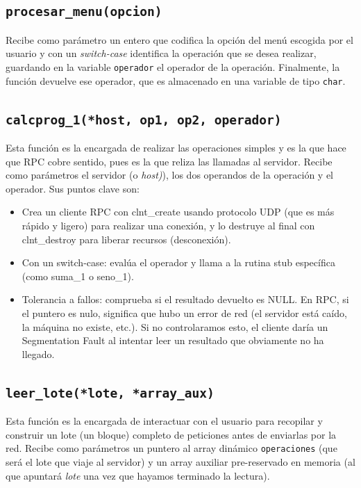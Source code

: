 \documentclass[a4paper,12pt]{article}
\begin{document}
	\subsection{\texttt{procesar\_menu(opcion)}}
		Recibe como parámetro un entero que codifica la opción del menú escogida por el usuario y con un \textit{switch-case} identifica la operación que se desea realizar, guardando en la variable \texttt{operador} el operador de la operación. Finalmente, la función devuelve ese operador, que es almacenado en una variable de tipo \texttt{char}.
		
	\subsection{\texttt{calcprog\_1(*host, op1, op2, operador)}}
		Esta función es la encargada de realizar las operaciones simples y es la que hace que RPC cobre sentido, pues es la que reliza las llamadas al servidor. Recibe como parámetros el servidor (o \textit{host)}), los dos operandos de la operación y el operador. Sus puntos clave son:
		\begin{itemize}
			\item Crea un cliente RPC con clnt\_create usando protocolo UDP (que es más rápido y ligero) para realizar una conexión, y lo destruye al final con clnt\_destroy para liberar recursos (desconexión).
			
			\item  Con un switch-case: evalúa el operador y llama a la rutina stub específica (como suma\_1 o seno\_1).
			
			\item  Tolerancia a fallos: comprueba si el resultado devuelto es NULL. En RPC, si el puntero es nulo, significa que hubo un error de red (el servidor está caído, la máquina no existe, etc.). Si no controlaramos esto, el cliente daría un Segmentation Fault al intentar leer un resultado que obviamente no ha llegado.
		\end{itemize}
		
	\subsection{\texttt{leer\_lote(*lote, *array\_aux)}}
		Esta función es la encargada de interactuar con el usuario para recopilar y construir un lote (un bloque)  completo de peticiones antes de enviarlas por la red. Recibe como parámetros un puntero al array dinámico \texttt{operaciones} (que será el lote que viaje al servidor) y un array auxiliar pre-reservado en memoria (al que apuntará \textit{lote} una vez que hayamos terminado la lectura).
		
\end{document}
